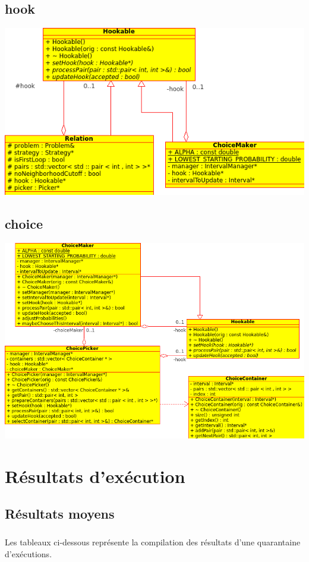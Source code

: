 \documentclass[a4paper,10pt]{report}
\begin{document}
\section{hook}
\includegraphics[width=\textwidth]{../UML/hook.png}

\section{choice}
\includegraphics[width=\textwidth]{../UML/choice.png}



\chapter{Résultats d'exécution}

\section{Résultats moyens}

\paragraph{}
  Les tableaux ci-dessous représente la compilation des résultats d'une
quarantaine d'exécutions.
\end{document}
